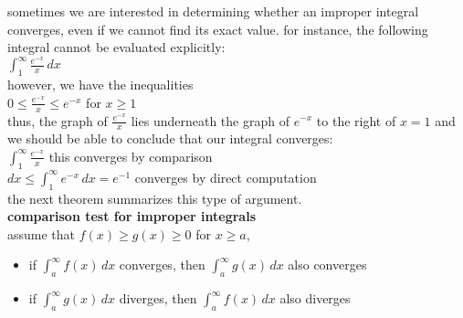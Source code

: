 \documentclass{article}
\begin{document}
sometimes we are interested in determining whether an improper integral converges, even if we cannot find its exact value. for instance, the following integral cannot be evaluated explicitly:\\
$\int_{1}^{\infty}\frac{e^{-x}}{x}\,dx$\\
however, we have the inequalities\\
$0 \leq \frac{e^{-x}}{x} \leq e^{-x}$ for $x \geq 1$\\
thus, the graph of $\frac{e^{-x}}{x}$ lies underneath the graph of $e^{-x}$ to the right of $x = 1$ and we should be able to conclude that our integral converges:\\
$\int_{1}^{\infty}\frac{e^{-x}}{x}$ this converges by comparison\\
$dx \leq \int_{1}^{\infty}e^{-x}\,dx = e^{-1}$ converges by direct computation\\
the next theorem summarizes this type of argument.\\

\textbf{comparison test for improper integrals}\\
assume that $f(x) \geq g(x) \geq 0$ for $x \geq a$,
	\begin{itemize}
		\item if $\int_{a}^{\infty}f(x)\,dx$ converges, then $\int_{a}^{\infty}g(x)\,dx$ also converges
		\item if $\int_{a}^{\infty}g(x)\,dx$ diverges, then $\int_{a}^{\infty}f(x)\,dx$ also diverges
	\end{itemize}
\end{document}
